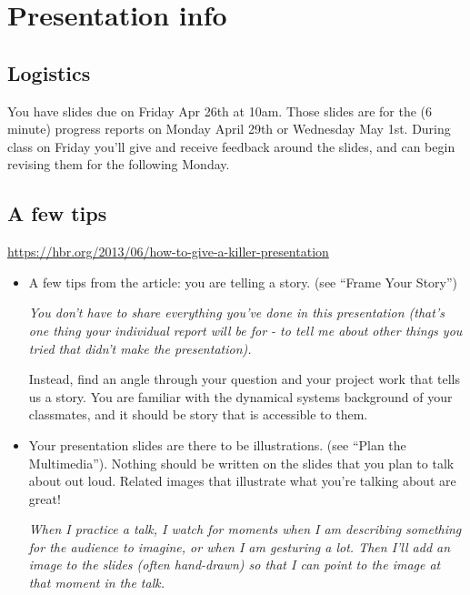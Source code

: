 \documentclass[12pt,letterpaper,noanswers]{exam}
\begin{document}
 \pdfpageheight 11in 
  \pdfpagewidth 8.5in
  
\section{Presentation info}
\subsection{Logistics}

You have slides due on Friday Apr 26th at 10am.  Those slides are for the (6 minute) progress reports on Monday April 29th or Wednesday May 1st.  During class on Friday you'll give and receive feedback around the slides, and can begin revising them for the following Monday.  

\subsection{A few tips}
\url{https://hbr.org/2013/06/how-to-give-a-killer-presentation}
\begin{itemize}
\item A few tips from the article: you are telling a story.  (see ``Frame Your Story'')

\emph{You don't have to share everything you've done in this presentation (that's one thing your individual report will be for - to tell me about other things you tried that didn't make the presentation).}

Instead, find an angle through your question and your project work that tells us a story.  You are familiar with the dynamical systems background of your classmates, and it should be story that is accessible to them.
\item Your presentation slides are there to be illustrations.  (see ``Plan the Multimedia'').  Nothing should be written on the slides that you plan to talk about out loud.  Related images that illustrate what you're talking about are great!

\emph{When I practice a talk, I watch for moments when I am describing something for the audience to imagine, or when I am gesturing a lot.  Then I'll add an image to the slides (often hand-drawn) so that I can point to the image at that moment in the talk.  }
\end{itemize}
\end{document}
